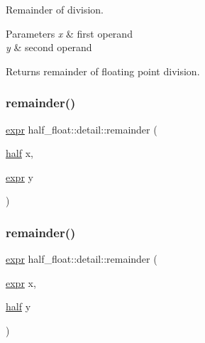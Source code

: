 Remainder of division. 
\begin{DoxyParams}{Parameters}
{\em x} & first operand \\
\hline
{\em y} & second operand \\
\hline
\end{DoxyParams}
\begin{DoxyReturn}{Returns}
remainder of floating point division. 
\end{DoxyReturn}
\mbox{\label{namespacehalf__float_1_1detail_af34ace7578dcc806426d3399ff1d6e8a}} 
\subsubsection{\texorpdfstring{remainder()}{remainder()}\hspace{0.1cm}{\footnotesize\ttfamily [2/4]}}
{\footnotesize\ttfamily \hyperlink{structhalf__float_1_1detail_1_1expr}{expr} half\+\_\+float\+::detail\+::remainder (\begin{DoxyParamCaption}\item[{\hyperlink{classhalf__float_1_1half}{half}}]{x,  }\item[{\hyperlink{structhalf__float_1_1detail_1_1expr}{expr}}]{y }\end{DoxyParamCaption})\hspace{0.3cm}{\ttfamily [inline]}}

\mbox{\label{namespacehalf__float_1_1detail_a45e1dc6152c5212225561095b0181609}} 
\subsubsection{\texorpdfstring{remainder()}{remainder()}\hspace{0.1cm}{\footnotesize\ttfamily [3/4]}}
{\footnotesize\ttfamily \hyperlink{structhalf__float_1_1detail_1_1expr}{expr} half\+\_\+float\+::detail\+::remainder (\begin{DoxyParamCaption}\item[{\hyperlink{structhalf__float_1_1detail_1_1expr}{expr}}]{x,  }\item[{\hyperlink{classhalf__float_1_1half}{half}}]{y }\end{DoxyParamCaption})\hspace{0.3cm}{\ttfamily [inline]}}

